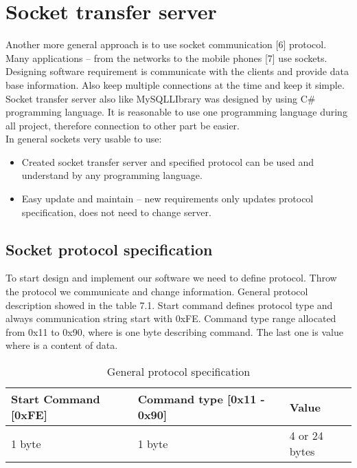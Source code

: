 %
\section{Socket transfer server}

Another more general approach is to use socket communication [6] protocol. Many applications – from the networks to the mobile phones [7] use sockets. Designing software requirement is communicate with the clients and provide data base information. Also keep multiple connections at the time and keep it simple.  Socket transfer server also like MySQLLIbrary was designed by using C\# programming language. It is reasonable to use one programming language during all project, therefore connection to other part be easier. \\ In general sockets very usable to use: 

\begin{itemize}
	\item Created socket transfer server and specified protocol can be used and understand by any programming language.
	\item Easy update and maintain – new requirements only updates protocol specification, does not need to change server.
\end{itemize}

\subsection{Socket protocol specification}

To start design and implement our software we need to define protocol. Throw the protocol we communicate and change information. General protocol description showed in the table 7.1. Start command defines protocol type and always communication string start with 0xFE. Command type range allocated from 0x11 to 0x90, where is one byte describing command. The last one is value where is a content of data.

\begin{table}[h]
	\centering
    \begin{tabular}{ | p{4cm} | p{5cm} | p{4cm} | }
    \hline
    \textbf{Start Command} [0xFE] & \textbf{Command type} [0x11 - 0x90] & \textbf{Value}  \\ \hline
    1 byte & 1 byte & 4 or 24 bytes  \\ \hline
    \end{tabular}
	\caption{General protocol specification}
	\label{tab:AdDis}
\end{table}

